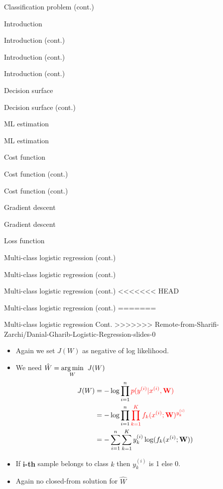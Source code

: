 \documentclass[serif, aspectratio=169]{beamer}
\begin{document}
\begin{frame}{Classification problem (cont.)}
\begin{itemize}
\begin{frame}{Introduction}
\begin{itemize}
\begin{frame}{Introduction (cont.)}
\begin{frame}{Introduction (cont.)}
\begin{frame}{Introduction (cont.)}
\begin{frame}{Decision surface}
\begin{itemize}
\begin{frame}{Decision surface (cont.)}
\begin{frame}{ML estimation}
\begin{frame}{ML estimation}
\begin{itemize}
\begin{frame}{Cost function}
\begin{frame}{Cost function (cont.)}
\begin{itemize}
\begin{itemize}
\begin{frame}{Cost function (cont.)}
\begin{frame}{Gradient descent}
\begin{frame}{Gradient descent}
\begin{frame}{Loss function}
\begin{frame}{Multi-class logistic regression (cont.)}
\begin{frame}{Multi-class logistic regression (cont.)}
\begin{frame}{Multi-class logistic regression (cont.)}
<<<<<<< HEAD
\begin{frame}{Multi-class logistic regression (cont.)}
=======
\begin{frame}{Multi-class logistic regression Cont.}
>>>>>>> Remote-from-Sharifi-Zarchi/Danial-Gharib-Logistic-Regression-slides-0
    \begin{itemize}
        \item Again we set $J(W)$ as negative of log likelihood.
        \item We need $\hat{W} = \underset{W}{\arg\min} \hspace{0.2cm} J(W)$
        \begin{align*}
            J(W) &= -\log \prod_{i=1}^{n} \textcolor{red}{p(y^{(i)}|x^{(i)}, \mathbf{W})} \\
            &= -\log \prod_{i=1}^{n}\textcolor{red}{\prod_{k=1}^{K}f_k(x^{(i)}; \mathbf{W})^{y_k^{(i)}} }\\
            &= -\sum_{i=1}^{n}\sum_{k=1}^{K}y_k^{(i)} \log (f_k(x^{(i)}; \mathbf{W}))
        \end{align*}
        \item If \textbf{$\textbf{i}$-th} sample belongs to class $k$ then $y^{(i)}_k$ is 1 else 0.
        \item Again no closed-from solution for $\hat{W}$
    \end{itemize}
    

\end{frame}
\end{frame}
\end{frame}
\end{frame}
\end{frame}
\end{frame}
\end{frame}
\end{frame}
\end{frame}
\end{itemize}
\end{itemize}
\end{frame}
\end{frame}
\end{itemize}
\end{frame}
\end{frame}
\end{frame}
\end{itemize}
\end{frame}
\end{frame}
\end{frame}
\end{frame}
\end{itemize}
\end{frame}
\end{itemize}
\end{frame}
\end{document}
